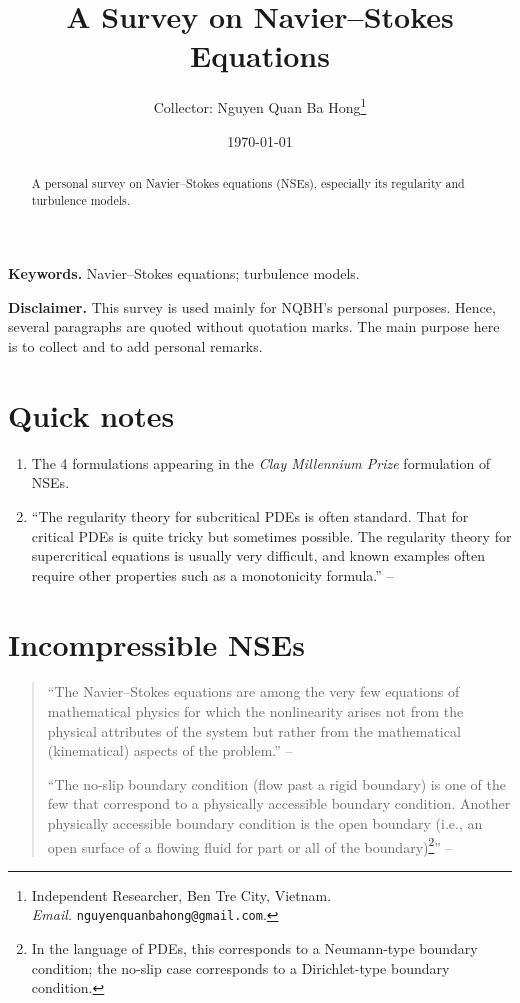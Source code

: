 \documentclass{article}
\title{A Survey on Navier--Stokes Equations}
\author{Collector: Nguyen Quan Ba Hong\footnote{Independent Researcher, Ben Tre City, Vietnam.\\\textit{Email.} \texttt{nguyenquanbahong@gmail.com}.}}
\date{\today}
\numberwithin{equation}{section}
\begin{document}
\maketitle

\begin{abstract}
	A personal survey on Navier--Stokes equations (NSEs), especially its regularity and turbulence models.
\end{abstract}
\textbf{Keywords.} Navier--Stokes equations; turbulence models.
\setcounter{secnumdepth}{4}
\setcounter{tocdepth}{4}
\tableofcontents

\vspace{5mm}
\textbf{Disclaimer.} This survey is used mainly for NQBH's personal purposes. Hence, several paragraphs are quoted without quotation marks. The main purpose here is to collect and to add personal remarks.
\section*{Quick notes}
\begin{enumerate}
	\item The 4 formulations appearing in the \textit{Clay Millennium Prize} formulation \cite{Fefferman2006} of NSEs.
	\item ``The regularity theory for subcritical PDEs is often standard. That for critical PDEs is quite tricky but sometimes possible. The regularity theory for supercritical equations is usually very difficult, and known examples often require other properties such as a monotonicity formula.'' -- \cite[p. 7]{Tsai2018}
\end{enumerate}

\section{Incompressible NSEs}
\begin{quotation}
	``The Navier--Stokes equations are among the very few equations of mathematical physics for which the nonlinearity arises not from the physical attributes of the system but rather from the mathematical (kinematical) aspects of the problem.'' -- \cite[p. 2]{Foias_Manley_Rosa_Temam2001}
	
	``The no-slip boundary condition (flow past a rigid boundary) is one of the few that correspond to a physically accessible boundary condition. Another physically accessible boundary condition is the open boundary (i.e., an open surface of a flowing fluid for part or all of the boundary)\footnote{In the language of PDEs, this corresponds to a Neumann-type boundary condition; the no-slip case corresponds to a Dirichlet-type boundary condition.}'' -- \cite[p. 45]{Foias_Manley_Rosa_Temam2001}
\end{quotation}
\end{document}

